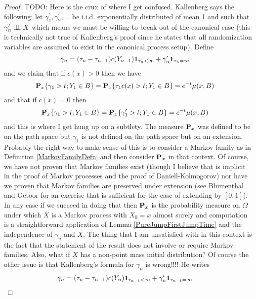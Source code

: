 \begin{proof}
TODO: Here is the crux of where I get confused.  Kallenberg says the
following:
let $\gamma_1^\prime, \gamma_2^\prime, \dotsc$ be i.i.d. exponentially
distributed of mean 1 and such that $\gamma_n^\prime \Independent X$
which means we must be willing to break out of the canonical case (this is technically not
true of Kallenberg's proof since he states that all randomization variables are assumed to exist
in the canonical process setup).  Define 
\begin{align*}
\gamma_n &= (\tau_n - \tau_{n-1})c(Y_{n-1}) \characteristic{\tau_{n} <
  \infty} + \gamma_n^\prime \characteristic{\tau_{n} =
  \infty} 
\end{align*}
and we claim that if $c(x) > 0$ then we have
\begin{align*}
\sprobability{\gamma_1 > t; Y_1 \in B}{x} &= \sprobability{\tau_1 c(x)
  > t; Y_1 \in B}{x} = e^{-t} \mu(x, B)
\end{align*}
and that if $c(x) = 0$ then 
\begin{align*}
\sprobability{\gamma_1 > t; Y_1 \in B}{x} &= \sprobability{\gamma^\prime_1 
  > t; Y_1 \in B}{x} = e^{-t} \mu(x, B)
\end{align*} 
and this is where I get hung up on a subtlety.  The measure
$\probabilityop_x$ was defined to be on the path space but $\gamma_1$
is not defined on the path space but on an extension.  Probably the
right way to make sense of this is to consider a Markov family as in
Definition \ref{MarkovFamilyDefn} and then consider $\probabilityop_x$
in that context.  Of course, we have not proven that Markov families
exist (though I believe that is implicit in the proof of Markov
processes and the proof of Daniell-Kolmogorov) nor have we proven that
Markov families are preserved under extension (see Blumenthal and Getoor for an exercise that
is sufficient for the case of extending by $[0,1]$).  In any case if we
succeed in doing that then $\probabilityop_x$ is the probability
measure on $\Omega$ under which $X$ is a Markov process with $X_0 = x$
almost surely and computation is a straightforward application of
Lemma \ref{PureJumpFirstJumpTime} and the independence of
$\gamma_n^\prime$ and $X$.  The thing that I am unsatisfied with in this context
is the fact that the statement of the result does not involve or
require Markov
families.  Also, what if $X$ has a non-point mass initial
distribution?  Of course the other issue is that Kallenberg's formula for
$\gamma_n$ is wrong!!!!  He writes
\begin{align*}
\gamma_n &= (\tau_n - \tau_{n-1})c(Y_n) \characteristic{\tau_{n-1} <
  \infty} + \gamma_n^\prime \characteristic{\tau_{n-1} =
  \infty} 
\end{align*}
\end{proof}

